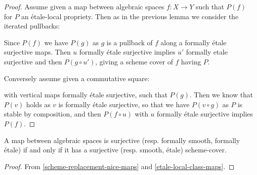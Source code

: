 \begin{proof}
Assume given a map between algebraic spaces $f:X\to Y$ such that $P(f)$ for $P$ an étale-local propriety. Then as in the previous lemma we consider the iterated pullbacks:
  \begin{center}
  \end{center}
  Since $P(f)$ we have $P(g)$ as $g$ is a pullback of $f$ along a formally étale surjective maps. Then $u$ formally étale surjective implies $u'$ formally etale surjective and then $P(g\circ u')$, giving a scheme cover of $f$ having $P$.
  
  Conversely assume given a commutative square:
  \begin{center}
  \end{center}
  with vertical maps formally étale surjective, such that $P(g)$. Then we know that $P(v)$ holds as $v$ is formally étale surjective, so that we have $P(v\circ g)$ as $P$ is stable by composition, and then $P(f\circ u)$ with $u$ formally étale surjective implies $P(f)$.
\end{proof}

\begin{corollary}
A map between algebraic spaces is surjective (resp. formally smooth, formally étale) if and only if it has a surjective (resp. smooth, étale) scheme-cover.
\end{corollary}

\begin{proof}
From \cref{scheme-replacement-nice-maps} and \cref{etale-local-class-maps}.
\end{proof}

